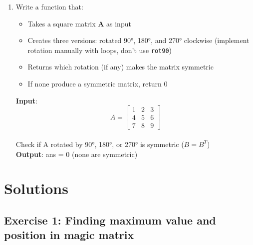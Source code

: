 \documentclass[oneside]{article}
\begin{document}
\begin{enumerate}
	\item
	      Write a function that:
	      \begin{itemize}
		      \item Takes a square matrix \textbf{A} as input
		      \item Creates three versions: rotated 90°, 180°, and 270° clockwise (implement rotation manually with loops, don't use \texttt{rot90})
		      \item Returns which rotation (if any) makes the matrix symmetric
		      \item If none produce a symmetric matrix, return 0
	      \end{itemize}
	      \begin{tcolorbox}[blanker, breakable, left=5mm, before skip=10pt, after skip=10pt, borderline west={1mm}{0pt}{primarycolor}]
		      \textbf{Input}: \begin{equation*}
			      A = \begin{bmatrix}
				      1 & 2 & 3 \\
				      4 & 5 & 6 \\
				      7 & 8 & 9
			      \end{bmatrix}
		      \end{equation*} \\
		      Check if A rotated by 90°, 180°, or 270° is symmetric ($B = B^T$)\\
		      \textbf{Output}: ans = 0 (none are symmetric)
	      \end{tcolorbox}
\end{enumerate}

\newpage
\section*{Solutions}

\subsection*{Exercise 1: Finding maximum value and position in magic matrix}
\end{document}
